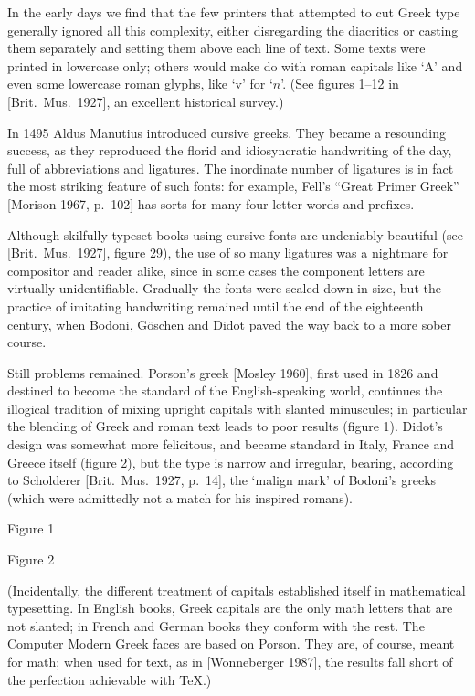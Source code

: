 In the early days we find that the few printers that attempted to cut
Greek type generally ignored all this complexity, either disregarding
the diacritics or casting them separately and setting them
above each line of text.  Some texts were printed in
lowercase only; others would make do with roman capitals like `A' and
even some lowercase roman glyphs, like `v' for `$n$'.  (See figures
1--12 in [Brit.~Mus.~1927], an excellent historical survey.)

In 1495 Aldus Manutius introduced cursive greeks.
They became a resounding success, as they reproduced the florid
and idiosyncratic handwriting of the day, full of abbreviations
and ligatures.  The inordinate number of ligatures is in fact the
most striking feature of such fonts: for example, Fell's ``Great
Primer Greek'' [Morison 1967, p.~102] has sorts for many
four-letter words and prefixes.

Although skilfully typeset books using cursive fonts are undeniably
beautiful (see [Brit.~Mus.~1927], figure 29), the use of so many
ligatures was a nightmare for compositor and reader alike, since
in some cases the component letters are virtually unidentifiable.
Gradually the fonts were scaled down in size, but the practice
of imitating handwriting remained until the end of the eighteenth
century, when Bodoni, G\"oschen and Didot paved the way back to a
more sober course.

Still problems remained.  Porson's greek [Mosley 1960], first used
in 1826 and destined to become the standard of the English-speaking
world, continues the illogical tradition of mixing upright capitals
with slanted minuscules; in particular the blending of Greek and roman
text leads to poor results (figure 1).  Didot's design was somewhat
more felicitous, and became standard in Italy, France and Greece itself
(figure 2), but the type is narrow and irregular, bearing, according
to Scholderer [Brit.~Mus.~1927, p.~14], the `malign mark' of Bodoni's
greeks (which were admittedly not a match for his inspired romans).
\caption{\eightpoint Figure 1}

\caption{\eightpoint Figure 2}

(Incidentally, the different treatment of capitals established itself
in mathematical typesetting.  In English books, Greek capitals are the
only math letters that are not slanted; in French and German books
they conform with the rest.  The Computer Modern Greek faces are
based on Porson.  They are, of course, meant for math; when used
for text, as in [Wonneberger 1987], the results fall short of
the perfection achievable with \TeX.)

